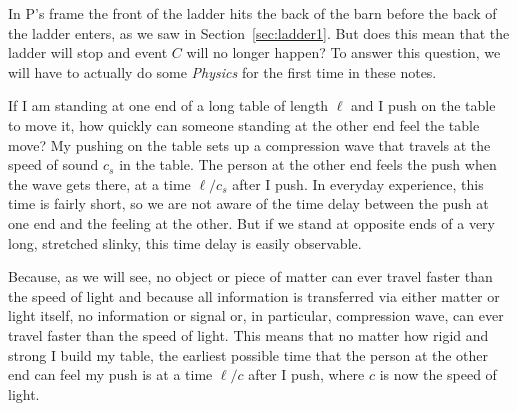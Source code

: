 In P's frame the front of the ladder hits the back of the barn before
the back of the ladder enters, as we saw in Section~\ref{sec:ladder1}.
But does this mean that the ladder will stop and event $C$ will no
longer happen?  To answer this question, we will have to actually do
some {\em Physics\/} for the first time in these notes.

If I am standing at one end of a long table of length $\ell$ and I
push on the table to move it, how quickly can someone standing at the
other end feel the table move?  My pushing on the table sets up a
compression wave that travels at the speed of sound $c_s$ in the
table.  The person at the other end feels the push when the wave gets
there, at a time $\ell /c_s$ after I push.  In everyday experience,
this time is fairly short, so we are not aware of the time delay
between the push at one end and the feeling at the other.  But if we
stand at opposite ends of a very long, stretched slinky, this time
delay is easily observable.

Because, as we will see, no object or piece of matter can ever travel
faster than the speed of light and because all information is
transferred via either matter or light itself, no information or
signal or, in particular, compression wave, can ever travel faster
than the speed of light.  This means that no matter how rigid and
strong I build my table, the earliest possible time that the person at
the other end can feel my push is at a time $\ell /c$ after I push,
where $c$ is now the speed of light.

